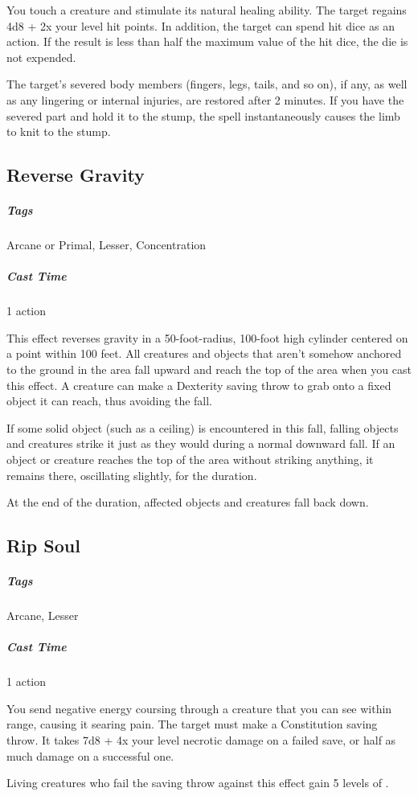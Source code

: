 You touch a creature and stimulate its natural healing ability. The target regains 4d8 + 2x your level hit points. In addition, the target can spend hit dice as an action. If the result is less than half the maximum value of the hit dice, the die is not expended.

The target's severed body members (fingers, legs, tails, and so on), if any, as well as any lingering or internal injuries, are restored after 2 minutes. If you have the severed part and hold it to the stump, the spell instantaneously causes the limb to knit to the stump.

\subsection{Reverse Gravity}\label{spell:reverse-gravity}
\subparagraph*{Tags} Arcane or Primal, Lesser, Concentration
\subparagraph*{Cast Time} 1 action

This effect reverses gravity in a 50-foot-radius, 100-foot high cylinder centered on a point within 100 feet. All creatures and objects that aren't somehow anchored to the ground in the area fall upward and reach the top of the area when you cast this effect. A creature can make a Dexterity saving throw to grab onto a fixed object it can reach, thus avoiding the fall.

If some solid object (such as a ceiling) is encountered in this fall, falling objects and creatures strike it just as they would during a normal downward fall. If an object or creature reaches the top of the area without striking anything, it remains there, oscillating slightly, for the duration.

At the end of the duration, affected objects and creatures fall back down.

\subsection{Rip Soul}\label{spell:rip-soul}
\subparagraph*{Tags} Arcane, Lesser
\subparagraph*{Cast Time} 1 action

You send negative energy coursing through a creature that you can see within range, causing it searing pain. The target must make a Constitution saving throw. It takes 7d8 + 4x your level necrotic damage on a failed save, or half as much damage on a successful one.

Living creatures who fail the saving throw against this effect gain 5 levels of .

